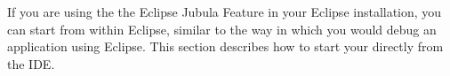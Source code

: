 
If you are using the the Eclipse Jubula Feature in your Eclipse installation, you can start \gdauts{} from within Eclipse, similar to the way 
in which you would debug an application using Eclipse. This section describes how
to start your \gdaut{} directly from the IDE. 
